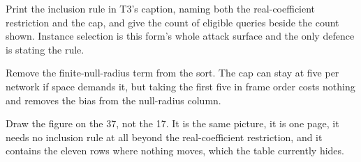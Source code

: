 Print the inclusion rule in T3's caption, naming both the real-coefficient restriction and the cap,
and give the count of eligible queries beside the count shown. Instance selection is this form's
whole attack surface and the only defence is stating the rule.

Remove the finite-null-radius term from the sort. The cap can stay at five per network if space
demands it, but taking the first five in frame order costs nothing and removes the bias from the
null-radius column.

Draw the figure on the 37, not the 17. It is the same picture, it is one page, it needs no
inclusion rule at all beyond the real-coefficient restriction, and it contains the eleven rows where
nothing moves, which the table currently hides.
